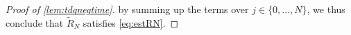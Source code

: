 \documentclass[
	fontsize=11pt, 
	twoside=false, 
	abstract=true, 
	a4paper,
]{scrartcl}
\newcommand{\dd}{\mathrm{d}}
\newcommand{\abs}[1]{\left\lvert#1\right\rvert}
\newcommand{\td}[1]{\tilde{#1}}
\begin{document}
\begin{proof}[Proof of \cref{lem:tdqnegtime}]
%
%
%
	by summing up the terms over $j\in \{0,\dots,N\}$, we thus conclude that $\td{R}_N$ satisfies \cref{eq:estRN}.
\end{proof}
\end{document}
